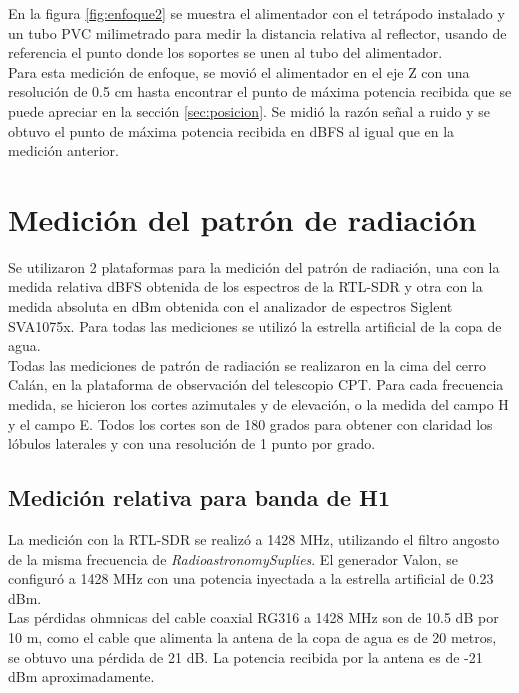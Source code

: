 En la figura \ref{fig:enfoque2} se muestra el alimentador con el tetrápodo instalado y un tubo PVC milimetrado para medir la distancia relativa al reflector, usando de referencia el punto donde los soportes se unen al tubo del alimentador.\\

Para esta medición de enfoque, se movió el alimentador en el eje Z con una resolución de 0.5 cm hasta encontrar el punto de máxima potencia recibida que se puede apreciar en la sección \ref{sec:posicion}. Se midió la razón señal a ruido y se obtuvo el punto de máxima potencia recibida en dBFS al igual que en la medición anterior.\\

\section{Medición del patrón de radiación}

Se utilizaron 2 plataformas para la medición del patrón de radiación, una con la medida relativa dBFS obtenida de los espectros de la RTL-SDR y otra con la medida absoluta en dBm obtenida con el analizador de espectros Siglent SVA1075x. Para todas las mediciones se utilizó la estrella artificial de la copa de agua.\\

Todas las mediciones de patrón de radiación se realizaron en la cima del cerro Calán, en la plataforma de observación del telescopio CPT. Para cada frecuencia medida, se hicieron los cortes azimutales y de elevación, o la medida del campo H y el campo E. Todos los cortes son de 180 grados para obtener con claridad los lóbulos laterales y con una resolución de 1 punto por grado.\\


\subsection{Medición relativa para banda de H1}

La medición con la RTL-SDR se realizó a 1428 MHz, utilizando el filtro angosto de la misma frecuencia de \textit{RadioastronomySuplies}. El generador Valon, se configuró a 1428 MHz con una potencia inyectada a la estrella artificial de 0.23 dBm.\\

Las pérdidas ohmnicas del cable coaxial RG316 a 1428 MHz son de 10.5 dB por 10 m, como el cable que alimenta la antena de la copa de agua es de 20 metros, se obtuvo una pérdida de 21 dB. La potencia recibida por la antena es de -21 dBm aproximadamente.\\

